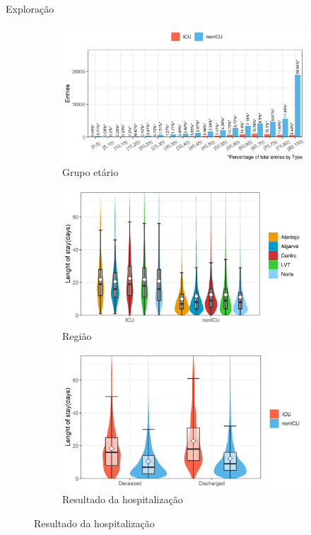 \documentclass[pdf]
{beamer}
\begin{document}
\begin{frame}{Exploração}
\begin{figure}
\begin{subfigure}{0.3\textwidth}
\end{subfigure}
\begin{subfigure}{0.3\textwidth}
\caption*{Grupo etário}
\vspace{-0.4cm}
\includegraphics[width=\textwidth]{Imagens/histPlot_Group_Type.jpeg}
\end{subfigure}
\begin{subfigure}{0.3\textwidth}
\caption*{Região}
\vspace{-0.4cm}
\includegraphics[width=\textwidth]{Imagens/violinBox_Region.jpeg}
\end{subfigure}
\begin{subfigure}{0.3\textwidth}
\caption*{Resultado da hospitalização}
\vspace{-0.4cm}
\includegraphics[width=\textwidth]{Imagens/violinBox_Outcome.jpeg}
\end{subfigure}
\end{figure}

\end{frame}
\end{document}
